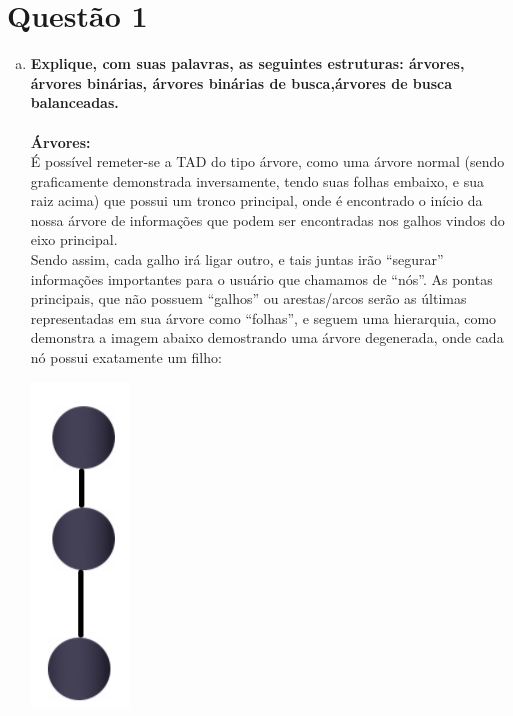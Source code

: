 \documentclass[11pt]{article} %
\begin{document}
\pagebreak

\section{Questão 1}

	\begin{enumerate}[a)]
		    \item {\bf Explique, com suas palavras, as seguintes estruturas: árvores, árvores binárias, árvores binárias de busca,árvores de busca balanceadas.}\\ \\
		
		{\bf Árvores:} \\
		
		\hspace{1cm} É possível remeter-se a TAD do tipo árvore, como uma árvore normal (sendo graficamente demonstrada inversamente, tendo suas folhas embaixo, e sua raiz acima) que possui um tronco principal, onde é encontrado o início da nossa árvore de informações que podem ser encontradas nos galhos vindos do eixo principal. \\
		\hspace*{1cm}Sendo assim, cada galho irá ligar outro, e tais juntas irão “segurar” informações importantes para o usuário que chamamos de “nós”. As pontas principais, que não possuem “galhos” ou arestas/arcos serão as últimas representadas em sua árvore como “folhas”, e seguem uma hierarquia, como demonstra a imagem abaixo demostrando uma árvore degenerada, onde cada nó possui exatamente um filho: 
	
		\begin{center}
			\includegraphics[scale = 0.7]{q1a.png}
		\end{center}
	

\end{enumerate}
\end{document}
